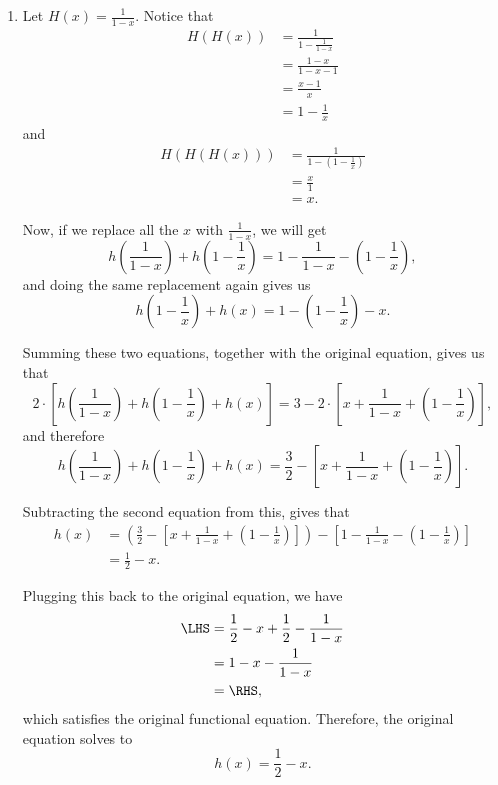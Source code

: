 \begin{enumerate}
    \item Let \(H(x) = \frac{1}{1 - x}\). Notice that
          \begin{align*}
              H(H(x)) & = \frac{1}{1 - \frac{1}{1 - x}} \\
                      & = \frac{1 - x}{1 - x - 1}       \\
                      & = \frac{x - 1}{x}               \\
                      & = 1 - \frac{1}{x}
          \end{align*}
          and
          \begin{align*}
              H(H(H(x))) & = \frac{1}{1 - \left(1 - \frac{1}{x}\right)} \\
                         & = \frac{x}{1}                                \\
                         & = x.
          \end{align*}

          Now, if we replace all the \(x\) with \(\frac{1}{1 - x}\), we will get
          \[
              h\left(\frac{1}{1 - x}\right) + h\left(1 - \frac{1}{x}\right) = 1 - \frac{1}{1 - x} - \left(1 - \frac{1}{x}\right),
          \]
          and doing the same replacement again gives us
          \[
              h\left(1 - \frac{1}{x}\right) + h(x) = 1 - \left(1 - \frac{1}{x}\right) - x.
          \]

          Summing these two equations, together with the original equation, gives us that
          \[
              2 \cdot \left[h\left(\frac{1}{1 - x}\right) + h\left(1 - \frac{1}{x}\right) + h(x)\right] = 3 - 2 \cdot \left[x + \frac{1}{1 - x} + \left(1 - \frac{1}{x}\right)\right],
          \]
          and therefore
          \[
              h\left(\frac{1}{1 - x}\right) + h\left(1 - \frac{1}{x}\right) + h(x) = \frac{3}{2} - \left[x + \frac{1}{1 - x} + \left(1 - \frac{1}{x}\right)\right].
          \]

          Subtracting the second equation from this, gives that
          \begin{align*}
              h(x) & = \left(\frac{3}{2} - \left[x + \frac{1}{1 - x} + \left(1 - \frac{1}{x}\right)\right]\right) - \left[1 - \frac{1}{1 - x} - \left(1 - \frac{1}{x}\right)\right] \\
                   & =\frac{1}{2} - x.
          \end{align*}

          Plugging this back to the original equation, we have
          \begin{align*}
              \LHS & = \frac{1}{2} - x + \frac{1}{2} - \frac{1}{1 - x} \\
                   & = 1 - x - \frac{1}{1 - x}                         \\
                   & = \RHS,
          \end{align*}
          which satisfies the original functional equation. Therefore, the original equation solves to
          \[
              h(x) = \frac{1}{2} - x.
          \]
\end{enumerate}
